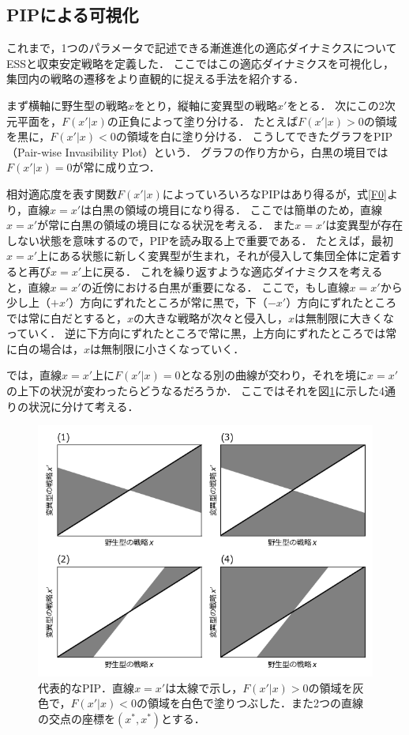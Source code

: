 \subsection{PIPによる可視化}
これまで，1つのパラメータで記述できる漸進進化の適応ダイナミクスについてESSと収束安定戦略を定義した．
ここではこの適応ダイナミクスを可視化し，集団内の戦略の遷移をより直観的に捉える手法を紹介する．

まず横軸に野生型の戦略$x$をとり，縦軸に変異型の戦略$x'$をとる．
次にこの2次元平面を，$F(x'|x)$の正負によって塗り分ける．
たとえば$F(x'|x)>0$の領域を黒に，$F(x'|x)<0$の領域を白に塗り分ける．
こうしてできたグラフをPIP（Pair-wise Invasibility Plot）という．
グラフの作り方から，白黒の境目では$F(x'|x)=0$が常に成り立つ．

相対適応度を表す関数$F(x'|x)$によっていろいろなPIPはあり得るが，式\eqref{F0}より，直線$x=x'$は白黒の領域の境目になり得る．
ここでは簡単のため，直線$x=x'$が常に白黒の領域の境目になる状況を考える．
また$x=x'$は変異型が存在しない状態を意味するので，PIPを読み取る上で重要である．
たとえば，最初$x=x'$上にある状態に新しく変異型が生まれ，それが侵入して集団全体に定着すると再び$x=x'$上に戻る．
これを繰り返すような適応ダイナミクスを考えると，直線$x=x'$の近傍における白黒が重要になる．
ここで，もし直線$x=x'$から少し上（$+x'$）方向にずれたところが常に黒で，下（$-x'$）方向にずれたところでは常に白だとすると，$x$の大きな戦略が次々と侵入し，$x$は無制限に大きくなっていく．
逆に下方向にずれたところで常に黒，上方向にずれたところでは常に白の場合は，$x$は無制限に小さくなっていく．

では，直線$x=x'$上に$F(x'|x)=0$となる別の曲線が交わり，それを境に$x=x'$の上下の状況が変わったらどうなるだろうか．
ここではそれを図\ref{fig:pip}に示した4通りの状況に分けて考える．

\begin{figure}[htbp]
  \centering
  \includegraphics[width=13cm]{pip.png}
  \caption{代表的なPIP．直線$x=x'$は太線で示し，$F(x'|x)>0$の領域を灰色で，$F(x'|x)<0$の領域を白色で塗りつぶした．また2つの直線の交点の座標を$(x^*,x^*)$とする．}
  \label{fig:pip}
\end{figure}

